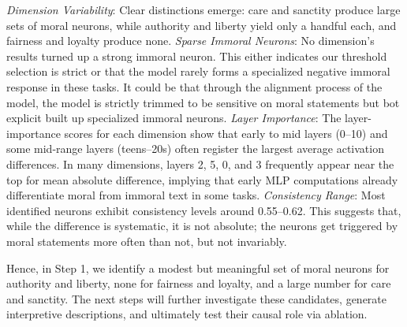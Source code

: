 \textit{Dimension Variability}: Clear distinctions emerge: care and sanctity produce large sets of moral neurons, while authority and liberty yield only a handful each, and fairness and loyalty produce none.
\textit{Sparse Immoral Neurons}: No dimension’s results turned up a strong immoral neuron. This either indicates our threshold selection is strict or that the model rarely forms a specialized negative immoral response in these tasks. It could be that through the alignment process of the model, the model is strictly trimmed to be sensitive on moral statements but bot explicit built up specialized immoral neurons. 
\textit{Layer Importance}: The layer-importance scores for each dimension show that early to mid layers (0–10) and some mid-range layers (teens–20s) often register the largest average activation differences. In many dimensions, layers 2, 5, 0, and 3 frequently appear near the top for mean absolute difference, implying that early MLP computations already differentiate moral from immoral text in some tasks.
\textit{Consistency Range}: Most identified neurons exhibit consistency levels around 0.55–0.62. This suggests that, while the difference is systematic, it is not absolute; the neurons get triggered by moral statements more often than not, but not invariably.

Hence, in Step 1, we identify a modest but meaningful set of moral neurons for authority and liberty, none for fairness and loyalty, and a large number for care and sanctity. The next steps will further investigate these candidates, generate interpretive descriptions, and ultimately test their causal role via ablation.



